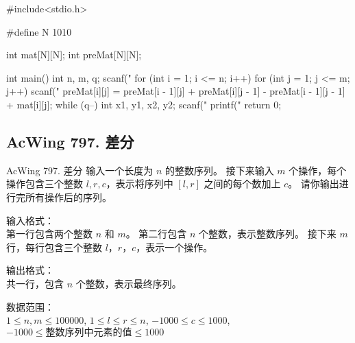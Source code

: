 \begin{mycpponecol}[子矩阵的和]
    #include<stdio.h>

    #define N 1010

    int mat[N][N];
    int preMat[N][N];

    int main() {
        int n, m, q;
        scanf("%
        for (int i = 1; i <= n; i++) {
            for (int j = 1; j <= m; j++) {
                scanf("%
                preMat[i][j] = preMat[i - 1][j] + preMat[i][j - 1] - preMat[i - 1][j - 1] + mat[i][j];
            }
        }
        while (q--) {
            int x1, y1, x2, y2;
            scanf("%
            printf("%
        }
        return 0;
    }
\end{mycpponecol}

\subsection{AcWing 797. 差分}
\begin{titledbox}{AcWing 797. 差分}
    输入一个长度为 $n$ 的整数序列。
    接下来输入 $m$ 个操作，每个操作包含三个整数 $l, r, c$，表示将序列中 $[l, r]$ 之间的每个数加上 $c$。
    请你输出进行完所有操作后的序列。

    输入格式：\\
    第一行包含两个整数 $n$ 和 $m$。
    第二行包含 $n$ 个整数，表示整数序列。
    接下来 $m$ 行，每行包含三个整数 $l，r，c$，表示一个操作。

    输出格式：\\
    共一行，包含 $n$ 个整数，表示最终序列。

    数据范围：\\
    $1 \le n,m \le 100000$,
    $1 \le l \le r \le n$,
    $-1000 \le c \le 1000$,
    $-1000 \le \text{整数序列中元素的值} \le 1000$

    \begin{inputblock}
         \\
         \\
         \\
         \\
         \\
    \end{inputblock}
    \begin{outputblock}
    \end{outputblock}
\end{titledbox}

